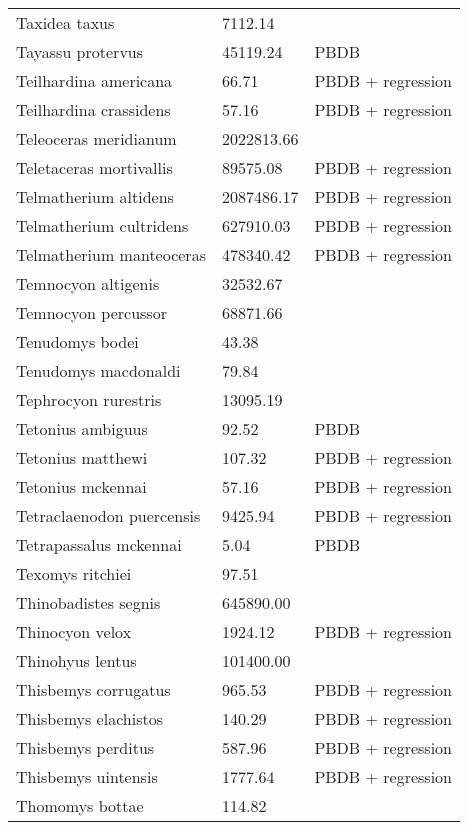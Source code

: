 \documentclass{article}
\begin{document}
\begin{center}
\begin{longtable}{p{} p{} p{} }
  Taxidea taxus & 7112.14 & \cite{Smith2004} \\ 
  Tayassu protervus & 45119.24 & PBDB \\ 
  Teilhardina americana & 66.71 & PBDB + regression \\ 
  Teilhardina crassidens & 57.16 & PBDB + regression \\ 
  Teleoceras meridianum & 2022813.66 & \cite{Tomiya2013} \\ 
  Teletaceras mortivallis & 89575.08 & PBDB + regression \\ 
  Telmatherium altidens & 2087486.17 & PBDB + regression \\ 
  Telmatherium cultridens & 627910.03 & PBDB + regression \\ 
  Telmatherium manteoceras & 478340.42 & PBDB + regression \\ 
  Temnocyon altigenis & 32532.67 & \cite{Tomiya2013} \\ 
  Temnocyon percussor & 68871.66 & \cite{Tomiya2013} \\ 
  Tenudomys bodei & 43.38 & \cite{Tomiya2013} \\ 
  Tenudomys macdonaldi & 79.84 & \cite{Tomiya2013} \\ 
  Tephrocyon rurestris & 13095.19 & \cite{Tomiya2013} \\ 
  Tetonius ambiguus & 92.52 & PBDB \\ 
  Tetonius matthewi & 107.32 & PBDB + regression \\ 
  Tetonius mckennai & 57.16 & PBDB + regression \\ 
  Tetraclaenodon puercensis & 9425.94 & PBDB + regression \\ 
  Tetrapassalus mckennai & 5.04 & PBDB \\ 
  Texomys ritchiei & 97.51 & \cite{Tomiya2013} \\ 
  Thinobadistes segnis & 645890.00 & \cite{McDonald2005} \\ 
  Thinocyon velox & 1924.12 & PBDB + regression \\ 
  Thinohyus lentus & 101400.00 & \cite{McKenna2011} \\ 
  Thisbemys corrugatus & 965.53 & PBDB + regression \\ 
  Thisbemys elachistos & 140.29 & PBDB + regression \\ 
  Thisbemys perditus & 587.96 & PBDB + regression \\ 
  Thisbemys uintensis & 1777.64 & PBDB + regression \\ 
  Thomomys bottae & 114.82 & \cite{Smith2004} \\ 

\end{longtable}
\end{center}
\end{document}
